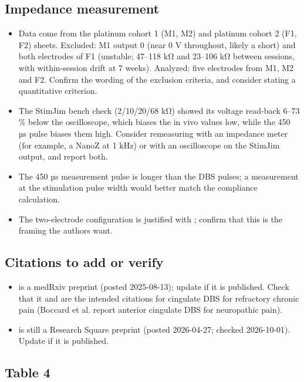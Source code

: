 \subsection{Impedance measurement}\label{notes-impedance}

\begin{itemize}
\item Data come from the platinum cohort 1 (M1, M2) and platinum cohort 2 (F1, F2) sheets. Excluded: M1 output 0 (near 0 V throughout, likely a short) and both electrodes of F1 (unstable; 47--118 kΩ and 23--106 kΩ between sessions, with within-session drift at 7 weeks). Analyzed: five electrodes from M1, M2 and F2. Confirm the wording of the exclusion criteria, and consider stating a quantitative criterion.
\item The StimJim bench check (2/10/20/68 kΩ) showed its voltage read-back 6--73 \% below the oscilloscope, which biases the in vivo values low, while the 450 µs pulse biases them high. Consider remeasuring with an impedance meter (for example, a NanoZ at 1 kHz) or with an oscilloscope on the StimJim output, and report both.
\item The 450 µs measurement pulse is longer than the DBS pulses; a measurement at the stimulation pulse width would better match the compliance calculation.
\item The two-electrode configuration is justified with \citet{koo2018}; confirm that this is the framing the authors want.
\end{itemize}

\subsection{Citations to add or verify}\label{notes-citations}

\begin{itemize}
\item \citet{shirvalkar2025} is a medRxiv preprint (posted 2025-08-13); update if it is published. Check that it and \citet{boccard2017} are the intended citations for cingulate DBS for refractory chronic pain (Boccard et al. report anterior cingulate DBS for neuropathic pain).
\item \citet{paulat2026} is still a Research Square preprint (posted 2026-04-27; checked 2026-10-01). Update if it is published.
\end{itemize}

\subsection{Table 4}\label{notes-table4}

